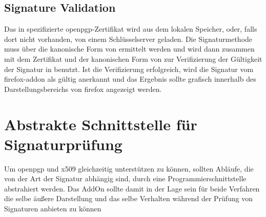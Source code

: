 \subsection{Signature Validation}
Das in  spezifizierte \gls{openpgp}-Zertifikat wird aus dem lokalen Speicher, oder, falls dort nicht vorhanden, von einem Schlüsselserver
geladen. Die Signaturmethode muss über die kanonische Form von  ermittelt werden und wird dann zusammen mit dem Zertifikat und der
kanonischen Form von  zur Verifizierung der Gültigkeit der Signatur in  benutzt. Ist die Verifizierung erfolgreich,
wird die Signatur vom \gls{firefox-addon} als gültig anerkannt und das Ergebnis sollte grafisch innerhalb des Darstellungsbereichs von \gls{firefox} angezeigt
werden.

\section{Abstrakte Schnittstelle für Signaturprüfung}
\label{sec:Anforderungen:Schnittstelle}
Um \gls{openpgp} und \gls{x509} gleichzeitig unterstützen zu können, sollten Abläufe, die von der Art der Signatur abhängig sind, durch eine
Programmierschnittstelle abstrahiert werden. Das AddOn sollte damit in der Lage sein für beide Verfahren die selbe äußere Darstellung und das selbe Verhalten
während der Prüfung von Signaturen anbieten zu können
